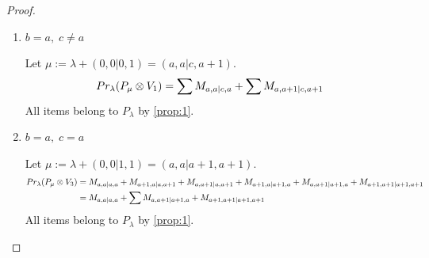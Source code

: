 \begin{proof}
\begin{enumerate}
  \item $ b = a,\; c \neq a $ \par
      Let $\mu:=\lambda + (0,0|0,1) = (a,a|c,a+1) $.
      \begin{equation}\notag
        \begin{aligned}
          Pr_{\lambda}(P_\mu \otimes V_{1}) &=
\sum M_{a,a|c,a}
+ \sum M_{a,a+1|c,a+1}
        \end{aligned}
      \end{equation}
All items belong to $P_\lambda$ by \cref{prop:1}.

  \item $ b = a,\; c = a $ \par
    Let $\mu:=\lambda + (0,0|1,1) = (a,a|a+1,a+1)$.
      \begin{equation}\notag
        \begin{aligned}
          Pr_{\lambda}(P_\mu \otimes V_{3}) &=
M_{a,a|a,a}
+ M_{a+1,a|a,a+1}
+ M_{a,a+1|a,a+1}
+ M_{a+1,a|a+1,a}
+ M_{a,a+1|a+1,a}
+ M_{a+1,a+1|a+1,a+1} \\
                                               &=
 M_{a,a|a,a}
+ \sum M_{a,a+1|a+1,a}
+  M_{a+1,a+1|a+1,a+1}
        \end{aligned}
      \end{equation}
All items belong to $P_\lambda$ by \cref{prop:1}.
\end{enumerate}
\end{proof}


